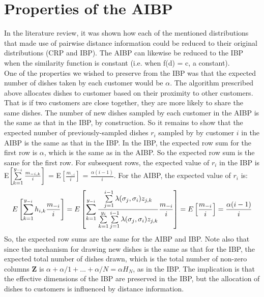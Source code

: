 \section{Properties of the AIBP}
In the literature review, it was shown how each of the mentioned distributions
that made use of pairwise distance information could be reduced to their original
distributions (CRP and IBP). The AIBP can likewise be reduced to the IBP when
the similarity function is constant (i.e. when f(d) = c, a constant).\\

\noindent
One of the properties we wished to preserve from the IBP was that the expected
number of dishes taken by each customer would be $\alpha$. The algorithm
prescribed above allocates dishes to customer based on their proximity to other
customers.  That is if two customers are close together, they are more likely
to share the same dishes. The number of new dishes sampled by each customer in
the AIBP is the same as that in the IBP, by construction. So it remains to show
that the expected number of previously-sampled dishes $r_i$ sampled by by
customer $i$ in the AIBP is the same as that in the IBP. In the IBP, the
expected row sum for the first row is $\alpha$, which is the same as in the
AIBP. So the expected row sum is the same for the first row. For subsequent
rows, the expected value of $r_i$ in the IBP is E$\left[\sum\limits_{k=1}^{y_{-i}}
\frac{m_{-i,k}}{i}\right]$ = E$\left[\frac{m_{-i}}{i}\right]$ =
$\frac{\alpha(i-1)}{i}$. For the AIBP, the expected value of $r_i$ is:
\[
  E\left[\sum\limits_{k=1}^{y_{-i}} h_{i,k} \frac{m_{-i}}{i}\right] = 
  E\left[\sum\limits_{k=1}^{y_{-i}}\displaystyle\frac{\sum\limits_{j=1}^{i-1}\lambda(\sigma_j,\sigma_i)z_{j,k}} {\sum\limits_{k=1}^{y_i}\sum\limits_{j=1}^{i-1}\lambda(\sigma_j,\sigma_i)z_{j,k}} \frac{m_{-i}}{i}\right] = 
  E\left[\frac{m_{-i}}{i}\right] = \frac{\alpha(i-1)}{i}
\]
So, the expected row sums are the same for the AIBP and IBP. Note also that
since the mechanism for drawing new dishes is the same as that for the IBP, the
expected total number of dishes drawn, which is the total number of non-zero
columns $\bm Z$ is $\alpha+\alpha/1+...+\alpha/N = \alpha H_N$, as in the IBP. 
The implication is that the effective dimensions of the IBP are preserved in the
IBP, but the allocation of dishes to customers is influenced by distance 
information.\\

